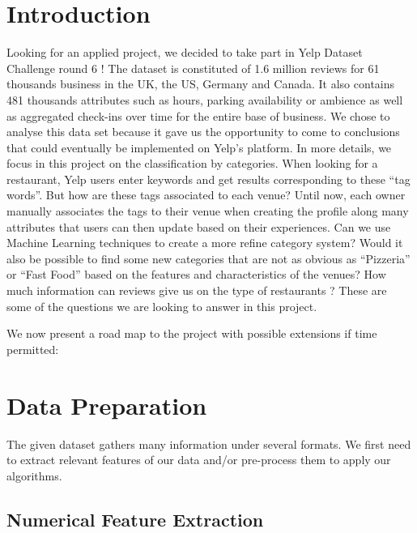 \documentclass[submit]{harvardml}
\begin{document}
\section*{Introduction}

Looking for an applied project, we decided to take part in Yelp Dataset Challenge round 6 ! The dataset is constituted of 1.6 million reviews for 61 thousands business in the UK, the US, Germany and Canada. It also contains 481 thousands attributes such as hours, parking availability or ambience as well as aggregated check-ins over time for the entire base of business. We chose to analyse this data set because it gave us the opportunity to come to conclusions that could eventually be implemented on Yelp’s platform. In more details, we focus in this project on the classification by categories. When looking for a restaurant, Yelp users enter keywords and get results corresponding to these “tag words”. But how are these tags associated to each venue? Until now, each owner manually associates the tags to their venue when creating the profile along many attributes that users can then update based on their experiences. Can we use Machine Learning techniques to create a more refine category system? Would it also be possible to find some new categories that are not as obvious as “Pizzeria” or “Fast Food” based on the features and characteristics of the venues? How much information can reviews give us on the type of restaurants ? These are some of the questions we are looking to answer in this project.

We now present a road map to the project with possible extensions if time permitted:

\section{Data Preparation}

The given dataset gathers many information under several formats. We first need to extract relevant features of our data and/or pre-process them to apply our algorithms.

\subsection{Numerical Feature Extraction}
\end{document}
